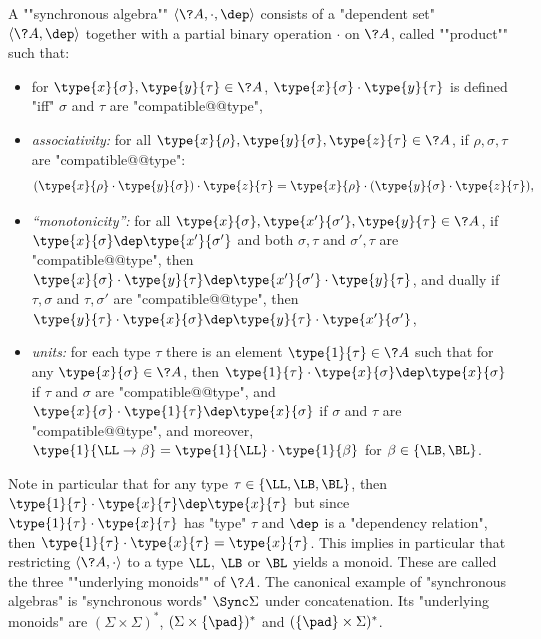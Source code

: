 \begin{definition}
	\AP\label{def:synchronous-algebra}
	A \AP""synchronous algebra"" $\langle \?A, \cdot, \dep \rangle$ consists of a "dependent set" $\langle \?A, \dep \rangle$ together
	with a partial binary operation $\cdot$ on $\?A$, called \AP""product"" such that:
	\begin{itemize}
		\item for $\type{x}{\sigma}, \type{y}{\tau} \in \?A$,
			$\type{x}{\sigma} \cdot \type{y}{\tau}$ is defined "iff" $\sigma$ and $\tau$
			are "compatible@@type",
		\item \emph{associativity:} for all $\type{x}{\rho}, \type{y}{\sigma}, \type{z}{\tau} \in \?A$, if $\rho, \sigma, \tau$ are "compatible@@type":
		\[
			(\type{x}{\rho} \cdot \type{y}{\sigma}) \cdot \type{z}{\tau} 
			= \type{x}{\rho} \cdot (\type{y}{\sigma} \cdot \type{z}{\tau}),
		\]
		\item \emph{``monotonicity'':} for all $\type{x}{\sigma}, \type{x'}{\sigma'}, \type{y}{\tau} \in \?A$, if $\type{x}{\sigma} \dep \type{x'}{\sigma'}$ and
		both $\sigma,\tau$ and $\sigma', \tau$ are "compatible@@type", then
		$\type{x}{\sigma}\cdot \type{y}{\tau} \dep \type{x'}{\sigma'}\cdot \type{y}{\tau}$,
		and dually if $\tau,\sigma$ and $\tau, \sigma'$ are "compatible@@type", then 
		$\type{y}{\tau}\cdot \type{x}{\sigma} \dep \type{y}{\tau}\cdot \type{x'}{\sigma'}$,
		\item \emph{units:} for each type $\tau$ there is an element $\type{1}{\tau} \in \?A$ 
			such that for any $\type{x}{\sigma} \in \?A$, then
			$\type{1}{\tau} \cdot \type{x}{\sigma} \dep \type{x}{\sigma}$
			if $\tau$ and $\sigma$ are "compatible@@type",
			and $\type{x}{\sigma} \cdot \type{1}{\tau} \dep \type{x}{\sigma}$
			if $\sigma$ and $\tau$ are "compatible@@type",
			and moreover, $\type{1}{\LL\to\beta} = \type{1}{\LL}\cdot \type{1}{\beta}$
			for $\beta \in \{\LB,\BL\}$.
	\end{itemize}
\end{definition}

Note in particular that for any type $\tau \in \{\LL,\LB,\BL\}$,
then $\type{1}{\tau} \cdot \type{x}{\tau} \dep \type{x}{\tau}$
but since $\type{1}{\tau} \cdot \type{x}{\tau}$ has "type" $\tau$ and $\dep$ is a
"dependency relation", then $\type{1}{\tau} \cdot \type{x}{\tau} = \type{x}{\tau}$.
This implies in particular that restricting $\langle \?A, \cdot \rangle$
to a type $\LL$, $\LB$ or $\BL$ yields a monoid.
These are called the three \AP""underlying monoids"" of $\?A$.
The canonical example of "synchronous algebras" is "synchronous words" $\Sync\Sigma$ under 
concatenation. Its "underlying monoids" are $(\Sigma\times\Sigma)^*$,
$(\Sigma\times\{\pad\})^*$ and $(\{\pad\}\times\Sigma)^*$.

